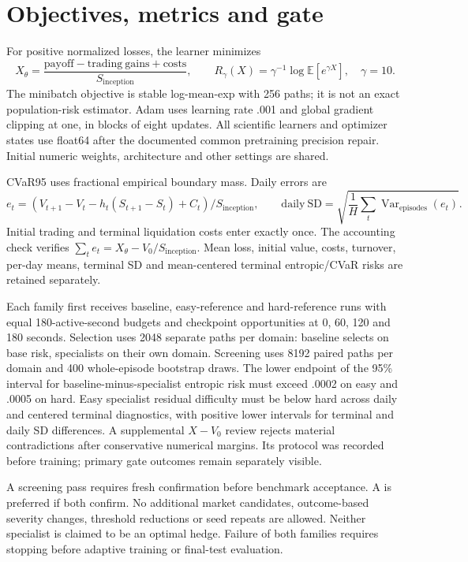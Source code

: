 \documentclass{article}
\begin{document}
\section*{Objectives, metrics and gate}
For positive normalized losses, the learner minimizes
\[
X_\theta=\frac{\mathrm{payoff}-\mathrm{trading\ gains}+\mathrm{costs}}{S_{\mathrm{inception}}},\qquad
R_\gamma(X)=\gamma^{-1}\log\mathbb E[e^{\gamma X}],\quad\gamma=10.
\]
The minibatch objective is stable log-mean-exp with 256 paths; it is not an exact population-risk estimator. Adam uses learning rate .001 and global gradient clipping at one, in blocks of eight updates. All scientific learners and optimizer states use float64 after the documented common pretraining precision repair. Initial numeric weights, architecture and other settings are shared.

CVaR95 uses fractional empirical boundary mass. Daily errors are
\[
e_t=(V_{t+1}-V_t-h_t(S_{t+1}-S_t)+C_t)/S_{\mathrm{inception}},\qquad
\mathrm{daily\ SD}=\sqrt{\frac1H\sum_t\operatorname{Var}_{\mathrm{episodes}}(e_t)}.
\]
Initial trading and terminal liquidation costs enter exactly once. The accounting check verifies $\sum_t e_t=X_\theta-V_0/S_{\mathrm{inception}}$. Mean loss, initial value, costs, turnover, per-day means, terminal SD and mean-centered terminal entropic/CVaR risks are retained separately.

Each family first receives baseline, easy-reference and hard-reference runs with equal 180-active-second budgets and checkpoint opportunities at 0, 60, 120 and 180 seconds. Selection uses 2048 separate paths per domain: baseline selects on base risk, specialists on their own domain. Screening uses 8192 paired paths per domain and 400 whole-episode bootstrap draws. The lower endpoint of the 95\% interval for baseline-minus-specialist entropic risk must exceed .0002 on easy and .0005 on hard. Easy specialist residual difficulty must be below hard across daily and centered terminal diagnostics, with positive lower intervals for terminal and daily SD differences. A supplemental $X-V_0$ review rejects material contradictions after conservative numerical margins. Its protocol was recorded before training; primary gate outcomes remain separately visible.

A screening pass requires fresh confirmation before benchmark acceptance. A is preferred if both confirm. No additional market candidates, outcome-based severity changes, threshold reductions or seed repeats are allowed. Neither specialist is claimed to be an optimal hedge. Failure of both families requires stopping before adaptive training or final-test evaluation.
\end{document}

